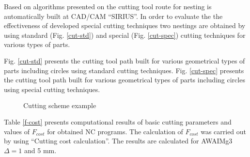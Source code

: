 \documentclass[runningheads]{llncs}
\begin{document}
Based on algorithms presented on \cite{ru26}
the cutting tool route for nesting is automatically built at CAD/CAM ``SIRIUS''.
In order to evaluate the the effectiveness of developed special cutting techniques
two nestings are obtained by using standard (Fig. \ref{cut-std})
and special (Fig. \ref{cut-spec})
cutting techniques for various types of parts.

Fig. \ref{cut-std} presents the cutting tool path
built for various geometrical types of parts including circles using standard cutting techniques.
Fig. \ref{cut-spec} presents the cutting tool path built for various geometrical types of parts
including circles using special cutting techniques.

\begin{figure}
  \centering
  \caption{Cutting scheme example}
  \label{cutting}
\end{figure}

Table \ref{f-cost}
presents computational results of basic cutting parameters and values of $F_{cost}$
for obtained NC programs.
The calculation of $F_{cost}$
was carried out by using ``Cutting cost calculation''.
The results are calculated for AWAIMg3 $\Delta = 1$ and 5 mm.
\end{document}
